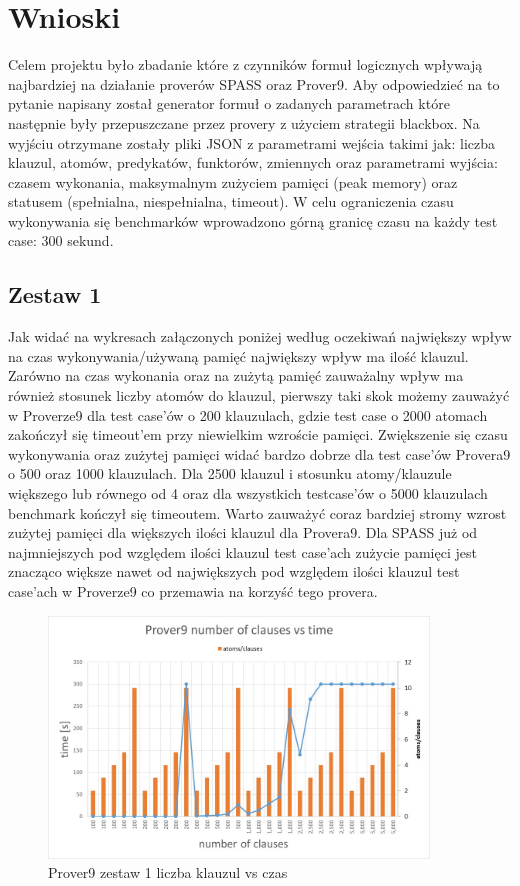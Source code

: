 \documentclass[a4paper,12pt]{article}
\begin{document}
\section{Wnioski}

Celem projektu było zbadanie które z czynników formuł logicznych wpływają najbardziej na działanie proverów SPASS oraz Prover9. Aby odpowiedzieć na to pytanie napisany został generator formuł o zadanych parametrach które następnie były przepuszczane przez provery z użyciem strategii blackbox. Na wyjściu otrzymane zostały pliki JSON z parametrami wejścia takimi jak: liczba klauzul, atomów, predykatów, funktorów, zmiennych oraz parametrami wyjścia: czasem wykonania, maksymalnym zużyciem pamięci (peak memory) oraz statusem (spełnialna, niespełnialna, timeout). W celu ograniczenia czasu wykonywania się benchmarków wprowadzono górną granicę czasu na każdy test case: 300 sekund.

\subsection{Zestaw 1}

Jak widać na wykresach załączonych poniżej według oczekiwań największy wpływ na czas wykonywania/używaną pamięć największy wpływ ma ilość klauzul.
Zarówno na czas wykonania oraz na zużytą pamięć zauważalny wpływ ma również stosunek liczby atomów do klauzul, pierwszy taki skok możemy zauważyć w Proverze9 dla test case'ów o 200 klauzulach, gdzie test case o 2000 atomach zakończył się timeout'em przy niewielkim wzroście pamięci. Zwiększenie się czasu wykonywania oraz zużytej pamięci widać bardzo dobrze dla test case'ów Provera9 o 500 oraz 1000 klauzulach. Dla 2500 klauzul i stosunku atomy/klauzule większego lub równego od 4 oraz dla wszystkich testcase'ów o 5000 klauzulach benchmark kończył się timeoutem. Warto zauważyć coraz bardziej stromy wzrost zużytej pamięci dla większych ilości klauzul dla Provera9. Dla SPASS już od najmniejszych pod względem ilości klauzul test case'ach zużycie pamięci jest znacząco większe nawet od największych pod względem ilości klauzul test case'ach w Proverze9 co przemawia na korzyść tego provera.

\begin{figure}[H]
  \centerline{\includegraphics[width=0.9\textwidth]{outputs/set1/set1 charts/01 Prover9 number of clauses vs time.jpg}}
  \caption{Prover9 zestaw 1 liczba klauzul vs czas}
\end{figure}
\end{document}
